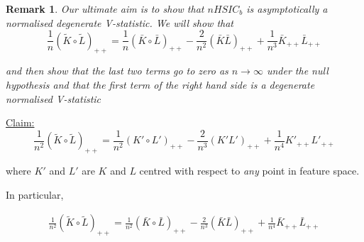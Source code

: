 \documentclass{article}
\newtheorem*{remark}{Remark}
\newenvironment{claim}[1]{\par\noindent\underline{Claim:}\space#1}{}
\begin{document}
\begin{remark}
Our ultimate aim is to show that $nHSIC_b$ is asymptotically a normalised degenerate V-statistic. We will show that 
\[\frac{1}{n}(\tilde{K}\circ\tilde{L})_{++} = \frac{1}{n}(\bar{K}\circ \bar{L})_{++} - \frac{2}{n^2}(\bar{K}\bar{L})_{++} + \frac{1}{n^3}\bar{K}_{++}\bar{L}_{++}\]

and then show that the last two terms go to zero as $n\longrightarrow \infty$ under the null hypothesis and that the first term of the right hand side is a degenerate normalised V-statistic
\end{remark}

\begin{claim}
\[\frac{1}{n^2}(\tilde{K}\circ\tilde{L})_{++} = \frac{1}{n^2}(K'\circ L')_{++} - \frac{2}{n^3}(K'L')_{++} + \frac{1}{n^4}K'_{++}L'_{++}\]

where $K'$ and $L'$ are $K$ and $L$ centred with respect to \emph{any} point in feature space.

In particular,

\begin{align*}
\frac{1}{n^2} (\tilde{K}\circ \tilde{L})_{++} = \frac{1}{n^2}(\bar{K}\circ \bar{L})_{++} - \frac{2}{n^3}(\bar{K}\bar{L})_{++} + \frac{1}{n^4}\bar{K}_{++}\bar{L}_{++}
\end{align*}
\end{claim}
\end{document}
